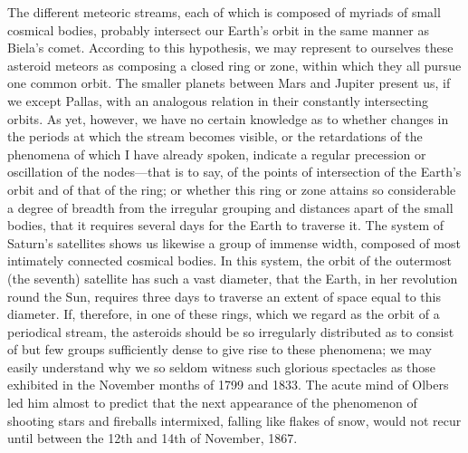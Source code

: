 The different meteoric streams, each of which is composed of myriads of small cosmical bodies, probably intersect our Earth's orbit in the same manner as Biela's comet. According to this hypothesis, we may represent to ourselves these asteroid meteors as composing a closed ring or zone, within which they all pursue one common orbit. The smaller planets between Mars and Jupiter present us, if we except Pallas, with an analogous relation in their constantly intersecting orbits. As yet, however, we have no certain knowledge as to whether changes in the periods at which the stream becomes visible, or the retardations of the phenomena of which I have already spoken, indicate a regular precession or oscillation of the nodes—that is to say, of the points of intersection of the Earth's orbit and of that of the ring; or whether this ring or zone attains so considerable a degree of breadth from the irregular grouping and distances apart of the small bodies, that it requires several days for the Earth to traverse it. The system of Saturn's satellites shows us likewise a group of immense width, composed of most intimately connected cosmical bodies. In this system, the orbit of the outermost (the seventh) satellite has such a vast diameter, that the Earth, in her revolution round the Sun, requires three days to traverse an extent of space equal to this diameter. If, therefore, in one of these rings, which we regard as the orbit of a periodical stream, the asteroids should be so irregularly distributed as to consist of but few groups sufficiently dense to give rise to these phenomena; we may easily understand why we so seldom witness such glorious spectacles as those exhibited in the November months of 1799 and 1833. The acute mind of Olbers led him almost to predict that the next appearance of the phenomenon of shooting stars and fireballs intermixed, falling like flakes of snow, would not recur until between the 12th and 14th of November, 1867.

